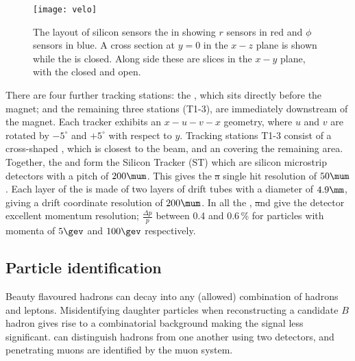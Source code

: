 
\begin{figure}
  \begin{center}
    \texttt{[image: velo]}
  \end{center}
  \caption[LHCb Vertex Locator]
  {\small
    The layout of silicon sensors the \velo in showing $r$ sensors in red and $\phi$ sensors in
    blue.
    A cross section at $y=0$ in the $x-z$ plane is shown while the \velo is closed.
    Along side these are slices in the $x-y$ plane, with the \velo closed and open.
  }
  \label{fig:lhcb:velo}
\end{figure}

There are four further tracking stations: the \ttracker, which sits directly
before the magnet; and the remaining three stations (T1-3), are immediately downstream of the
magnet.
Each tracker exhibits an $x-u-v-x$ geometry, where $u$ and $v$ are rotated by $-5^\circ$ and
$+5^\circ$ with respect to $y$.
Tracking stations T1-3 consist of a cross-shaped \intr, which is closest to the beam, and
an \ot covering the remaining area.
Together, the \ttracker and \intr form the Silicon Tracker (ST) which are silicon microstrip
detectors with a pitch of $200\mum$.
This gives the \st a single hit resolution of $50\mum$.
Each layer of the \ot is made of two layers of drift tubes with a diameter of $4.9\mm$, giving a
drift coordinate resolution of $200\mum$.
In all the \velo, \st and \ot give the \lhcb detector excellent momentum resolution;
$\tfrac{\Delta p}{p}$ between 0.4 and 0.6\,\% for particles with momenta of $5\gev$ and $100\gev$
respectively.


\subsection{Particle identification}
Beauty flavoured hadrons can decay into any (allowed) combination of hadrons and
leptons.
Misidentifying daughter particles when reconstructing a candidate $B$ hadron gives rise to a
combinatorial background making the signal less significant.
\lhcb can distinguish hadrons from one another using two \rich detectors, and penetrating muons are
identified by the muon system.


